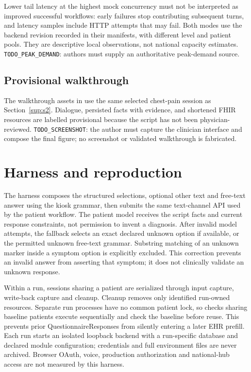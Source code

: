Lower tail latency at the highest mock concurrency must not be interpreted as
improved successful workflows: early failures stop contributing subsequent turns,
and latency samples include HTTP attempts that may fail. Both modes use the
backend revision recorded in their manifests, with different level and patient
pools. They are descriptive local observations, not national capacity estimates.
\texttt{TODO\_PEAK\_DEMAND}: authors must supply an authoritative peak-demand source.

\subsection{Provisional walkthrough}
The walkthrough assets in  use the same selected
chest-pain session as Section~\ref{sup:s2}. Dialogue, persisted facts with evidence,
and shortened FHIR resources are labelled provisional because the script has not
been physician-reviewed. \texttt{TODO\_SCREENSHOT}: the author must capture the
clinician interface and compose the final figure; no screenshot or validated
walkthrough is fabricated.

\section{Harness and reproduction}\label{sup:s7}
The harness composes the structured selections, optional other text and free-text
answer using the kiosk grammar, then submits the same text-channel API used by the
patient workflow. The patient model receives the script facts and current response
constraints, not permission to invent a diagnosis. After invalid model attempts,
the fallback selects an exact declared unknown option if available, or the permitted
unknown free-text grammar. Substring matching of an unknown marker inside a symptom
option is explicitly excluded. This correction prevents an invalid answer from
asserting that symptom; it does not clinically validate an unknown response.

Within a run, sessions sharing a patient are serialized through input capture,
write-back capture and cleanup. Cleanup removes only identified run-owned resources.
Separate run processes have no common patient lock, so checks sharing baseline
patients execute sequentially and check the baseline before reuse. This prevents
prior QuestionnaireResponses from silently entering a later EHR prefill. Each run
starts an isolated loopback backend with a run-specific database and declared
module configuration; credentials and full environment files are never archived.
Browser OAuth, voice, production authorization and national-hub access are not
measured by this harness.

